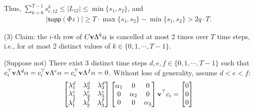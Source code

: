 \documentclass[../thesis.tex]{subfiles}
\begin{document}
Thus, $\sum_{k=0}^{T-1}  s_{r,12}^k \le \lvert L_{12} \vert \le \min \{s_1, s_2 \} $, and
\begin{equation}
\begin{aligned}
	\lvert \textsf{supp} (\Phi z) \vert \ge T \cdot \max\{ s_1, s_2 \} - \min \{ s_1, s_2 \}  > 2q \cdot T .\nonumber 
\end{aligned}
\end{equation}


%
(3) Claim: the $i$-th row of $C{\bf v}\Lambda^k \alpha$ is cancelled at most 2 times over $T$ time steps, i.e., for at most 2 distinct values of $k \in \{0, 1, \cdots, T-1\}$. 
	
	(Suppose not) There exist 3 distinct time steps $d, e, f \in \{0, 1, \cdots, T-1\}$ such that $c_i^\top {\bf v} \Lambda^d \alpha = c_i^\top {\bf v} \Lambda^e \alpha = c_i^\top {\bf v} \Lambda^f \alpha = 0$. Without loss of generality, assume $d<e<f$:
	\begin{equation}
		\begin{bmatrix} \lambda_1^d & \lambda_2^d & \lambda_3^d \\
					\lambda_1^e & \lambda_2^e & \lambda_3^e \\
					\lambda_1^f & \lambda_2^f & \lambda_3^f 
		\end{bmatrix}
		\begin{bmatrix} \alpha_1 & 0 & 0 \\ 0 & \alpha_2 & 0 \\ 0 & 0 & \alpha_3 \end{bmatrix} {\bf v}^\top c_i 
		= \begin{bmatrix} 0 \\ 0 \\ 0 \end{bmatrix} \nonumber
	\end{equation}
	
\end{document}
